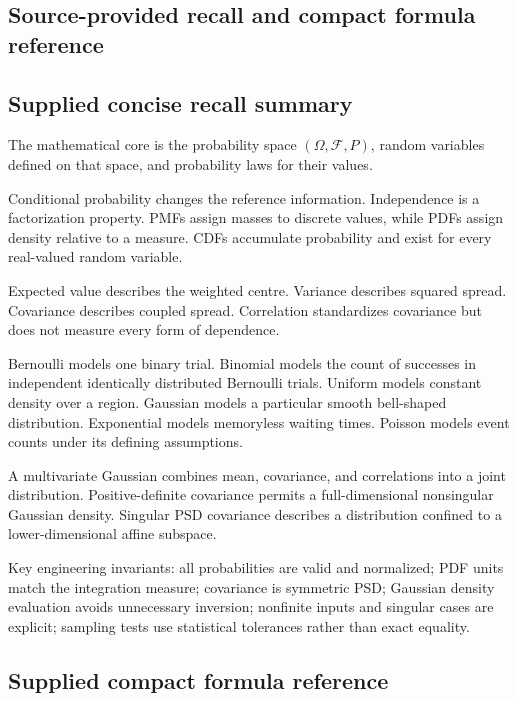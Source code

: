\subsection{Source-provided recall and compact formula reference}\label{appendix-cb5af353ef77-source-provided-recall-and-compact-formula-reference}

\subsection{Supplied concise recall summary}\label{appendix-cb5af353ef77-supplied-concise-recall-summary}

The mathematical core is the probability space \((\Omega,\mathcal F,P)\), random variables defined on that space, and probability laws for their values.

Conditional probability changes the reference information. Independence is a factorization property. PMFs assign masses to discrete values, while PDFs assign density relative to a measure. CDFs accumulate probability and exist for every real-valued random variable.

Expected value describes the weighted centre. Variance describes squared spread. Covariance describes coupled spread. Correlation standardizes covariance but does not measure every form of dependence.

Bernoulli models one binary trial. Binomial models the count of successes in independent identically distributed Bernoulli trials. Uniform models constant density over a region. Gaussian models a particular smooth bell-shaped distribution. Exponential models memoryless waiting times. Poisson models event counts under its defining assumptions.

A multivariate Gaussian combines mean, covariance, and correlations into a joint distribution. Positive-definite covariance permits a full-dimensional nonsingular Gaussian density. Singular PSD covariance describes a distribution confined to a lower-dimensional affine subspace.

Key engineering invariants: all probabilities are valid and normalized; PDF units match the integration measure; covariance is symmetric PSD; Gaussian density evaluation avoids unnecessary inversion; nonfinite inputs and singular cases are explicit; sampling tests use statistical tolerances rather than exact equality.

\subsection{Supplied compact formula reference}\label{appendix-cb5af353ef77-supplied-compact-formula-reference}

